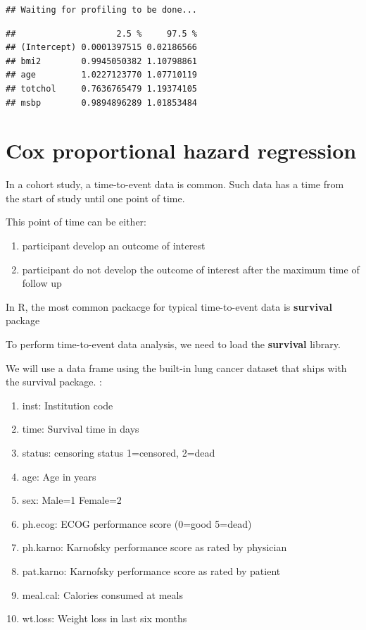 \documentclass[]{book}
\providecommand{\tightlist}{%
  \setlength{\itemsep}{0pt}\setlength{\parskip}{0pt}}
\theoremstyle{definition}
\theoremstyle{definition}
\theoremstyle{remark}
\begin{document}
\begin{verbatim}
## Waiting for profiling to be done...
\end{verbatim}

\begin{verbatim}
##                    2.5 %     97.5 %
## (Intercept) 0.0001397515 0.02186566
## bmi2        0.9945050382 1.10798861
## age         1.0227123770 1.07710119
## totchol     0.7636765479 1.19374105
## msbp        0.9894896289 1.01853484
\end{verbatim}

\section{Cox proportional hazard
regression}\label{cox-proportional-hazard-regression}

In a cohort study, a time-to-event data is common. Such data has a time
from the start of study until one point of time.

This point of time can be either:

\begin{enumerate}
\def\labelenumi{\arabic{enumi}.}
\tightlist
\item
  participant develop an outcome of interest
\item
  participant do not develop the outcome of interest after the maximum
  time of follow up
\end{enumerate}

In R, the most common packacge for typical time-to-event data is
\textbf{survival} package

To perform time-to-event data analysis, we need to load the
\textbf{survival} library.

We will use a data frame using the built-in lung cancer dataset that
ships with the survival package. :

\begin{enumerate}
\def\labelenumi{\arabic{enumi}.}
\tightlist
\item
  inst: Institution code
\item
  time: Survival time in days
\item
  status: censoring status 1=censored, 2=dead
\item
  age: Age in years
\item
  sex: Male=1 Female=2
\item
  ph.ecog: ECOG performance score (0=good 5=dead)
\item
  ph.karno: Karnofsky performance score as rated by physician
\item
  pat.karno: Karnofsky performance score as rated by patient
\item
  meal.cal: Calories consumed at meals
\item
  wt.loss: Weight loss in last six months
\end{enumerate}
\end{document}

